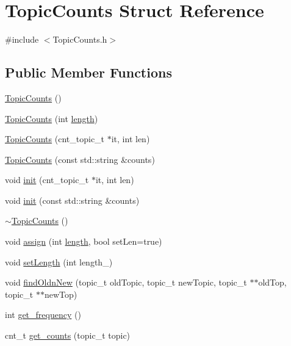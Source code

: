 \hypertarget{struct_topic_counts}{
\section{TopicCounts Struct Reference}
\label{struct_topic_counts}
}


{\ttfamily \#include $<$TopicCounts.h$>$}

\subsection*{Public Member Functions}
\begin{DoxyCompactItemize}
\item 
\hyperlink{struct_topic_counts_a8610e13cc9d52222d4c34c1914f70640}{TopicCounts} ()
\item 
\hyperlink{struct_topic_counts_a58673c799b8bd91f357d5492df78e9cf}{TopicCounts} (int \hyperlink{struct_topic_counts_abbecea34e46a52c0bfec37872960e18d}{length})
\item 
\hyperlink{struct_topic_counts_a045ad6ded5a1b6bcf608c2aa65370622}{TopicCounts} (cnt\_\-topic\_\-t $\ast$it, int len)
\item 
\hyperlink{struct_topic_counts_a999dc787d880d568be9f5c8475fea998}{TopicCounts} (const std::string \&counts)
\item 
void \hyperlink{struct_topic_counts_aa2c279222d93b6e5329b16744fdb2218}{init} (cnt\_\-topic\_\-t $\ast$it, int len)
\item 
void \hyperlink{struct_topic_counts_a1b625b3b8e01723b1cd79ac436b50b3e}{init} (const std::string \&counts)
\item 
\hyperlink{struct_topic_counts_aa57464ff14acfe74e7d402bc9b3af6aa}{$\sim$TopicCounts} ()
\item 
void \hyperlink{struct_topic_counts_a1c7c655d5af23b70a29e236d2814d6e0}{assign} (int \hyperlink{struct_topic_counts_abbecea34e46a52c0bfec37872960e18d}{length}, bool setLen=true)
\item 
void \hyperlink{struct_topic_counts_ac51ca3ff002097319e5e7562cf98f31e}{setLength} (int length\_\-)
\item 
void \hyperlink{struct_topic_counts_ae4bd9fecceabe2e87ebd54b81442055f}{findOldnNew} (topic\_\-t oldTopic, topic\_\-t newTopic, topic\_\-t $\ast$$\ast$oldTop, topic\_\-t $\ast$$\ast$newTop)
\item 
int \hyperlink{struct_topic_counts_aaab5b0bf2f9051671d4a53ac0b60e1a5}{get\_\-frequency} ()
\item 
cnt\_\-t \hyperlink{struct_topic_counts_a1289a13a2d59db891d9775acab93cc1e}{get\_\-counts} (topic\_\-t topic)

\end{DoxyCompactItemize}
